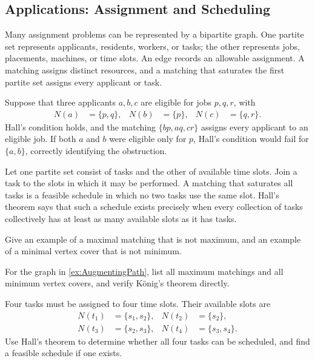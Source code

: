 \subsection{Applications: Assignment and Scheduling}\label{subsec:MatchingApplications}

Many assignment problems can be represented by a bipartite graph. One partite set represents applicants, residents, workers, or tasks; the other represents jobs, placements, machines, or time slots. An edge records an allowable assignment. A matching assigns distinct resources, and a matching that saturates the first partite set assigns every applicant or task.

\begin{Example}\label{ex:JobAssignment}
Suppose that three applicants $a,b,c$ are eligible for jobs $p,q,r$, with
\begin{align*}
N(a)&=\{p,q\}, & N(b)&=\{p\}, & N(c)&=\{q,r\}.
\end{align*}
Hall's condition holds, and the matching $\{bp,aq,cr\}$ assigns every applicant to an eligible job. If both $a$ and $b$ were eligible only for $p$, Hall's condition would fail for $\{a,b\}$, correctly identifying the obstruction.
\end{Example}

\begin{Example}\label{ex:TaskScheduling}
Let one partite set consist of tasks and the other of available time slots. Join a task to the slots in which it may be performed. A matching that saturates all tasks is a feasible schedule in which no two tasks use the same slot. Hall's theorem says that such a schedule exists precisely when every collection of tasks collectively has at least as many available slots as it has tasks.
\end{Example}

\begin{Exercise}
Give an example of a maximal matching that is not maximum, and an example of a minimal vertex cover that is not minimum.
\end{Exercise}

\begin{Exercise}
For the graph in \cref{ex:AugmentingPath}, list all maximum matchings and all minimum vertex covers, and verify K\"onig's theorem directly.
\end{Exercise}

\begin{Exercise}
Four tasks must be assigned to four time slots. Their available slots are
\begin{align*}
N(t_1)&=\{s_1,s_2\}, & N(t_2)&=\{s_2\},\\
N(t_3)&=\{s_2,s_3\}, & N(t_4)&=\{s_3,s_4\}.
\end{align*}
Use Hall's theorem to determine whether all four tasks can be scheduled, and find a feasible schedule if one exists.
\end{Exercise}

